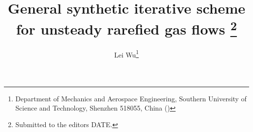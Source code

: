	\title{General synthetic iterative scheme for unsteady rarefied gas flows
		 \thanks{Submitted to the editors DATE.
	}}
	
	\author{
		 Lei Wu\thanks{Department of Mechanics and Aerospace Engineering, Southern University of Science and Technology, Shenzhen 518055, China () }%
	}
	
	
